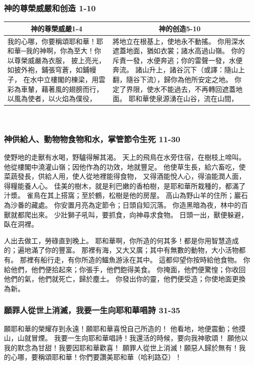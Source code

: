 \subsubsection{神的尊榮威嚴和创造 1-10}
\begin{table}[H]
\centering
\begin{tabular}{p{}|p{8.75cm}}\hline\hline
\multicolumn{1}{c|}{神的尊榮威嚴1-4}&\multicolumn{1}{c}{神的创造5-10}\\\hline
我的心哪，你要稱頌耶和華！耶和華─我的神啊，你為至大！你以尊榮威嚴為衣服，
披上亮光，如披外袍，鋪張穹蒼，如鋪幔子，
在水中立樓閣的棟梁，用雲彩為車輦，藉著風的翅膀而行，
以風為使者，以火焰為僕役，
&將地立在根基上，使地永不動搖。
你用深水遮蓋地面，猶如衣裳；諸水高過山嶺。
你的斥責一發，水便奔逃；你的雷聲一發，水便奔流。
諸山升上，諸谷沉下（或譯：隨山上翻，隨谷下流），歸你為他所安定之地。
你定了界限，使水不能過去，不再轉回遮蓋地面。
耶和華使泉源湧在山谷，流在山間，\\\hline
\end{tabular}
\end{table} 


\subsubsection{神供給人、動物物食物和水，掌管節令生死 11-30}
使野地的走獸有水喝，野驢得解其渴。
天上的飛鳥在水旁住宿，在樹枝上啼叫。
他從樓閣中澆灌山嶺；因他作為的功效，地就豐足。
他使草生長，給六畜吃，使菜蔬發長，供給人用，使人從地裡能得食物，
又得酒能悅人心，得油能潤人面，得糧能養人心。
佳美的樹木，就是利巴嫩的香柏樹，是耶和華所栽種的，都滿了汁漿。
雀鳥在其上搭窩；至於鶴，松樹是他的房屋。
高山為野山羊的住所；巖石為沙番的藏處。
你安置月亮為定節令；日頭自知沉落。
你造黑暗為夜，林中的百獸就都爬出來。
少壯獅子吼叫，要抓食，向神尋求食物。
日頭一出，獸便躲避，臥在洞裡。


人出去做工，勞碌直到晚上。
耶和華啊，你所造的何其多！都是你用智慧造成的；遍地滿了你的豐富。
那裡有海，又大又廣；其中有無數的動物，大小活物都有。
那裡有船行走，有你所造的鱷魚游泳在其中。
這都仰望你按時給他食物。
你給他們，他們便拾起來；你張手，他們飽得美食。
你掩面，他們便驚惶；你收回他們的氣，他們就死亡，歸於塵土。
你發出你的靈，他們便受造；你使地面更換為新。

\subsubsection{願罪人從世上消滅，我要一生向耶和華唱詩 31-35}
願耶和華的榮耀存到永遠！願耶和華喜悅自己所造的！
他看地，地便震動；他摸山，山就冒煙。
我要一生向耶和華唱詩！我還活的時候，要向我神歌頌！
願他以我的默念為甘甜！我要因耶和華歡喜！
願罪人從世上消滅！願惡人歸於無有！我的心哪，要稱頌耶和華！你們要讚美耶和華（哈利路亞）！

